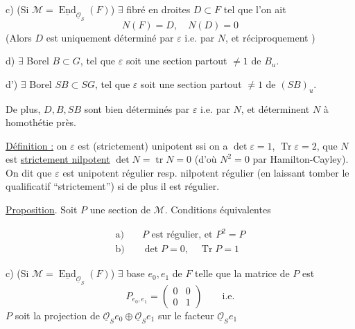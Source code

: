 c) (Si $\mathcal M=\underline{\operatorname{End}}_{\underline{\mathcal O}_S}(F)$) $\exists$ fibré en droites $D\subset F$ tel que l'on ait
\[
N(F)=D,\quad N(D)=0
\]
(Alors $D$ est uniquement déterminé par $\varepsilon$ i.e. par $N$, et réciproquement )


d) $\exists$ Borel $B\subset G$, tel que $\varepsilon$ soit une section partout $\ne1$ de $B_u$.

d') $\exists$ Borel $SB\subset SG$, tel que $\varepsilon$ soit une section partout $\ne1$ de $(SB)_u$.

 De plus, $D,B,SB$ sont bien déterminés par $\varepsilon$ i.e. par $N$, et déterminent $N$ à homothétie près.

\uline{Définition :} on   $\varepsilon$ est (strictement) unipotent ssi on a $\det\varepsilon=1$, $\operatorname{Tr}\varepsilon=2$, que $N$ est \uline{strictement nilpotent}  $\det N=\operatorname{tr}N=0$ (d'où $N^2=0$ par Hamilton-Cayley). On dit que $\varepsilon$ est unipotent régulier resp. nilpotent régulier (en laissant tomber le qualificatif ``strictement'') si de plus il est régulier.



\uline{Proposition}. Soit $P$ une section de $\mathcal M$. Conditions équivalentes

\[
\begin{aligned}
\text{a)}\quad &P\text{ est régulier, et }P^2=P\\
\text{b)}\quad &\det P=0,\quad\operatorname{Tr}P=1
\end{aligned}
\]

c) (Si $\mathcal M=\underline{\operatorname{End}}_{\underline{\mathcal O}_S}(F)$) $\exists$ base $e_0,e_1$ de $F$ telle que la matrice de $P$ est
\[
P_{e_0,e_1}=\begin{pmatrix}0&0\\0&1\end{pmatrix}\qquad\text{i.e.}
\]
$P$ soit la projection de $\underline{\mathcal O}_S e_0\oplus\underline{\mathcal O}_S e_1$ sur le facteur $\underline{\mathcal O}_S e_1$

